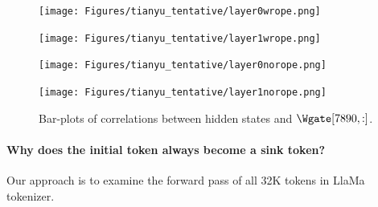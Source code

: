 \begin{figure}[H]
\centering
\begin{minipage}{.24\textwidth}
\centering
    \label{fig:l0-rope-corr}
    \texttt{[image: Figures/tianyu\_tentative/layer0wrope.png]}
\end{minipage}
\begin{minipage}{.24\textwidth}
\centering
    \label{fig:l1-rope-corr}
    \texttt{[image: Figures/tianyu\_tentative/layer1wrope.png]}
\end{minipage}
\begin{minipage}{.24\textwidth}
\centering
    \label{fig:l0-norope-corr}
    \texttt{[image: Figures/tianyu\_tentative/layer0norope.png]}
\end{minipage}
\begin{minipage}{.24\textwidth}
\centering
    \label{fig:l0-rope-corr}
    \texttt{[image: Figures/tianyu\_tentative/layer1norope.png]}
\end{minipage}
\caption{
\small
Bar-plots of correlations between hidden states and $\Wgate[7890, :]$.
}
\label{fig:special-neuron}
\vspace{-1em}
\end{figure}


\paragraph{Why does the initial token always become a sink token?}
Our approach is to examine the forward pass of all 32K tokens in LlaMa tokenizer.


